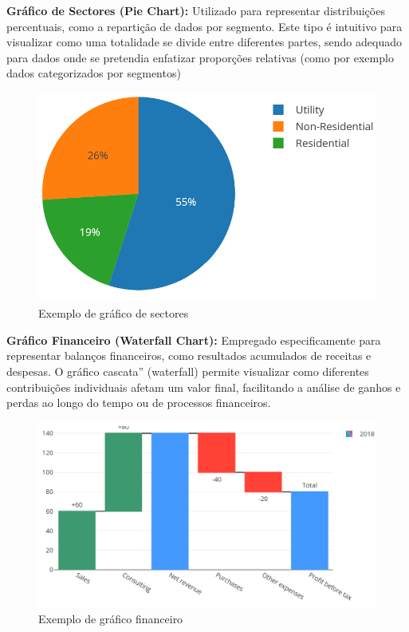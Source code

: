 \textbf{Gráfico de Sectores (Pie Chart):}  
Utilizado para representar distribuições percentuais, como a repartição de dados por segmento. Este tipo é  intuitivo para visualizar como uma totalidade se divide entre diferentes partes, sendo adequado para dados onde se pretendia enfatizar proporções relativas (como por exemplo dados categorizados por segmentos)

\begin{figure}[H]
    \centering
    \includegraphics[max width=12cm, keepaspectratio]{./img/pie}
    \caption{Exemplo de gráfico de sectores}
\end{figure}
\noindent

\textbf{Gráfico Financeiro (Waterfall Chart):}  
Empregado especificamente para representar balanços financeiros, como resultados acumulados de receitas e despesas. O gráfico cascata” (waterfall) permite visualizar como diferentes contribuições individuais afetam um valor final, facilitando a análise de ganhos e perdas ao longo do tempo ou de processos financeiros.

\begin{figure}[H]
    \centering
    \includegraphics[max width=12cm, keepaspectratio]{./img/waterfall}
    \caption{Exemplo de gráfico financeiro}
\end{figure}
\noindent

